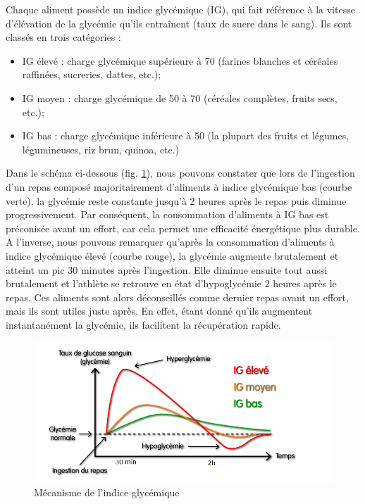         \label{ig}Chaque aliment possède un indice glycémique (IG), qui fait référence à la vitesse d'élévation de la glycémie qu'ils entraînent (taux de sucre dans le sang). Ils sont classés en trois catégories : 
        
        \begin{itemize}
            \item IG élevé : charge glycémique supérieure à 70 (farines blanches et céréales raffinées, sucreries, dattes, etc.);
            \item IG moyen : charge glycémique de 50 à 70 (céréales complètes, fruits secs, etc.);
            \item IG bas : charge glycémique inférieure à 50  (la plupart des fruits et légumes, légumineuses, riz brun, quinoa, etc.)\\
        \end{itemize}
        
        Dans le schéma ci-dessous (fig. \ref{fig:indice_glycemique}), nous pouvons constater que lors de l'ingestion d'un repas composé majoritairement d'aliments à indice glycémique bas (courbe verte), la glycémie reste constante jusqu'à 2 heures après le repas puis diminue progressivement. Par conséquent, la consommation d'aliments à IG bas est préconisée avant un effort, car cela permet une efficacité énergétique plus durable. A l'inverse, nous pouvons remarquer qu'après la consommation d'aliments à indice glycémique élevé (courbe rouge), la glycémie augmente brutalement et atteint un pic 30 minutes après l'ingestion. Elle diminue ensuite tout aussi brutalement et l'athlète se retrouve en état d'hypoglycémie 2 heures après le repas. Ces aliments sont alors déconseillés comme dernier repas avant un effort, mais ils sont utiles juste après. En effet, étant donné qu'ils augmentent instantanément la glycémie, ils facilitent la récupération rapide.
        
        \begin{figure}[H]
            \centering
            \includegraphics[scale=0.6]{images/courbe-index-glycemique.png}
            \caption{\label{fig:indice_glycemique}Mécanisme de l'indice glycémique}
        \end{figure}
        
